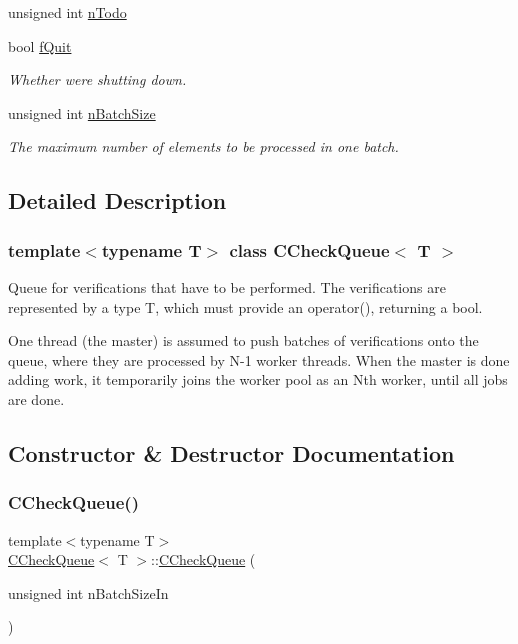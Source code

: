 \begin{DoxyCompactItemize}
unsigned int \mbox{\hyperlink{class_c_check_queue_a07acb246ed2003ae8083f2d0bda903da}{n\+Todo}}
\item 
bool \mbox{\hyperlink{class_c_check_queue_a46ea155382762d0f556cdfa3433f04c6}{f\+Quit}}
\begin{DoxyCompactList}\small\item\em Whether we\textquotesingle{}re shutting down. \end{DoxyCompactList}\item 
unsigned int \mbox{\hyperlink{class_c_check_queue_ae5d2df2dfa32a0b7f514bcd5debc52da}{n\+Batch\+Size}}
\begin{DoxyCompactList}\small\item\em The maximum number of elements to be processed in one batch. \end{DoxyCompactList}\end{DoxyCompactItemize}


\subsection{Detailed Description}
\subsubsection*{template$<$typename T$>$\newline
class C\+Check\+Queue$<$ T $>$}

Queue for verifications that have to be performed. The verifications are represented by a type T, which must provide an operator(), returning a bool.

One thread (the master) is assumed to push batches of verifications onto the queue, where they are processed by N-\/1 worker threads. When the master is done adding work, it temporarily joins the worker pool as an N\textquotesingle{}th worker, until all jobs are done. 

\subsection{Constructor \& Destructor Documentation}
\mbox{\label{class_c_check_queue_ad0e6a979f8433c05770350bc6b90a849}} 
\subsubsection{\texorpdfstring{C\+Check\+Queue()}{CCheckQueue()}}
{\footnotesize\ttfamily template$<$typename T$>$ \\
\mbox{\hyperlink{class_c_check_queue}{C\+Check\+Queue}}$<$ T $>$\+::\mbox{\hyperlink{class_c_check_queue}{C\+Check\+Queue}} (\begin{DoxyParamCaption}\item[{unsigned int}]{n\+Batch\+Size\+In }\end{DoxyParamCaption})\hspace{0.3cm}{\ttfamily [inline]}}



